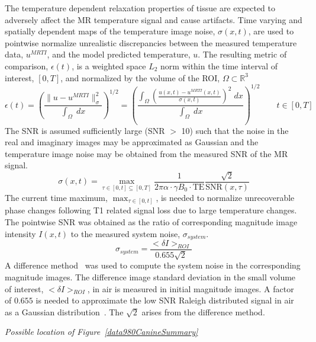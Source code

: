 \documentclass{article}
\begin{document}
The temperature dependent relaxation properties of tissue are
expected to adversely affect the MR temperature signal and cause
artifacts.  Time varying and spatially dependent maps of the
temperature image noise, $\sigma(x,t)$, are used to pointwise
normalize unrealistic discrepancies between the measured
temperature data, $u^{MRTI}$, and the model predicted temperature,
$u$. The resulting metric of comparison, $\epsilon(t)$, is a
weighted space $L_2$ norm within the time interval of interest,
$[0,T]$, and normalized by the volume of the ROI, 
$\Omega \subset \mathbb{R}^3$
\begin{equation}\label{weightedL2Norm}
\epsilon(t) = 
\left( 
\frac{ \|u - u^{MRTI}\|^2_\sigma }{ \int_\Omega \; dx }
\right)^{1/2}
 = 
\left( 
  \frac{ 
    \int_\Omega \left(
                     \frac{u(x,t) - u^{MRTI}(x,t)}{\sigma(x,t)}
               \right)^2 \; dx 
       }{ \int_\Omega \; dx }
\right)^{1/2}
   \qquad t \in [0,T]
\end{equation}
The SNR is assumed sufficiently large (SNR $>$ 10) such that the
noise in the real and imaginary images may be approximated as
Gaussian and the temperature image noise may be obtained from the
measured SNR of the MR signal.
\[
\sigma(x,t) = \max_{\tau \in [0,t] \subseteq [0,T]}
              \frac{ 1 } { 2 \pi \alpha \cdot \gamma B_0 \cdot \text{TE}}
              \frac{ \sqrt{2} }{ \text{SNR}(x,\tau) }
\]
The current time maximum, $\max_{\tau \in [0,t]}$, is needed to
normalize unrecoverable phase changes following T1 related signal
loss due to large temperature changes.  The pointwise SNR was
obtained as the ratio of corresponding magnitude image intensity
$I(x,t)$ to the measured system noise, $\sigma_{system}$. 
\[
\sigma_{system} = \frac{<\delta I>_{ROI}}{0.655 \sqrt{2}}
\]
A difference method~\cite{Reeder07} was used to compute the system
noise in the corresponding magnitude images.  The difference image
standard deviation in the small volume of interest, $<\delta
I>_{ROI}$, in air is measured in initial magnitude images.  A
factor of $0.655$ is needed to approximate the low SNR Raleigh
distributed signal in air as a Gaussian
distribution~\cite{Haacke99}. The $\sqrt{2}$ arises from the
difference method.

\begin{center}
 \textit{Possible location of Figure~\ref{data980CanineSummary}}
\end{center}
\end{document}
